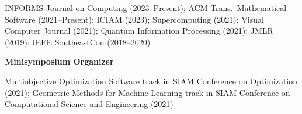 \documentclass[alternative,compact,blue]{/Users/tyler/Git/thchang-style/styles/lualatex/yaac-another-awesome-cv}
\begin{document}
\nopagebreak

INFORMS Journal on Computing (2023--Present); ACM Trans.\ Mathematical Software (2021--Present); ICIAM (2023); Supercomputing (2021); Visual Computer Journal (2021); Quantum Information Processing (2021); JMLR (2019); IEEE SoutheastCon (2018--2020)

\goodbreak

\medskip

\textbf{\large Minisymposium Organizer}

\nopagebreak \medskip \nopagebreak

Multiobjective Optimization Software track in SIAM Conference on Optimization (2021); Geometric Methods for Machine Learning track in SIAM Conference on Computational Science and Engineering (2021)

\goodbreak
\end{document}
